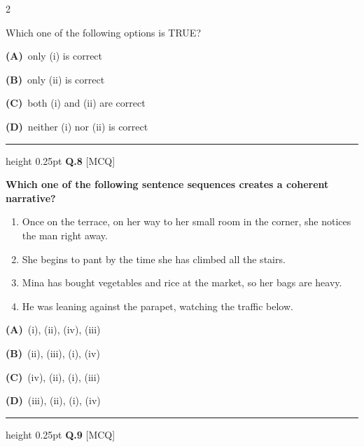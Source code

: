 \documentclass[a4paper,10pt,twoside]{article}
\begin{document}
\begin{multicols}{2}
{\begin{enumerate}[label=(\roman*),itemsep=0pt,topsep=2pt]
\end{enumerate}
Which one of the following options is TRUE? \par}
\par\vspace{2pt}\noindent
\textbf{(A)}~only (i) is correct\par\vspace{2pt}\noindent
\textbf{(B)}~only (ii) is correct\par\vspace{2pt}\noindent
\textbf{(C)}~both (i) and (ii) are correct\par\vspace{2pt}\noindent
\textbf{(D)}~neither (i) nor (ii) is correct
\par\vspace{6pt}\hrule height 0.25pt\vspace{6pt}
\noindent\textbf{Q.8} \hfill {\footnotesize\textsf{[MCQ]}}
\par\vspace{2pt}
{\bfseries Which one of the following sentence sequences creates a coherent narrative?
\begin{enumerate}[label=(\roman*),itemsep=0pt,topsep=2pt]
\item Once on the terrace, on her way to her small room in the corner, she notices the man right away.
\item She begins to pant by the time she has climbed all the stairs.
\item Mina has bought vegetables and rice at the market, so her bags are heavy.
\item He was leaning against the parapet, watching the traffic below.
\end{enumerate} \par}
\par\vspace{2pt}\noindent
\textbf{(A)}~(i), (ii), (iv), (iii)\par\vspace{2pt}\noindent
\textbf{(B)}~(ii), (iii), (i), (iv)\par\vspace{2pt}\noindent
\textbf{(C)}~(iv), (ii), (i), (iii)\par\vspace{2pt}\noindent
\textbf{(D)}~(iii), (ii), (i), (iv)
\par\vspace{6pt}\hrule height 0.25pt\vspace{6pt}
\noindent\textbf{Q.9} \hfill {\footnotesize\textsf{[MCQ]}}

\end{multicols}
\end{document}

